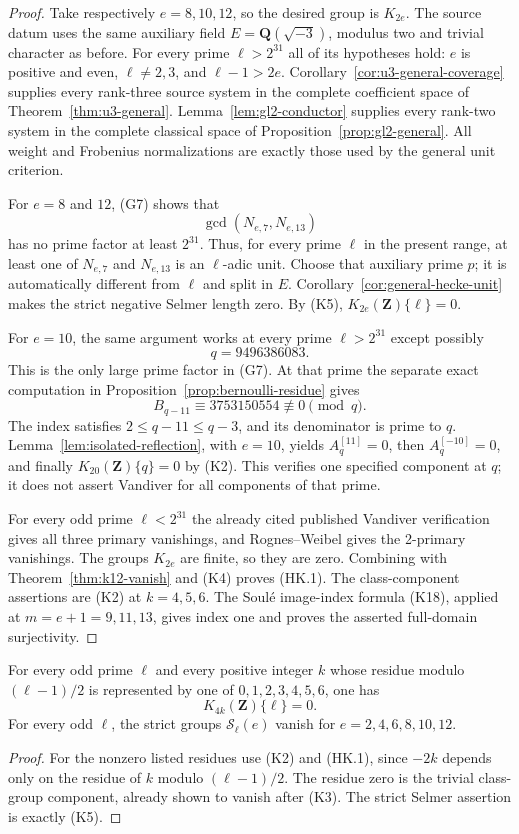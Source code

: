 \begin{proof}
Take respectively $e=8,10,12$, so the desired group is $K_{2e}$.
The source datum uses the same auxiliary field
$E=\mathbf Q(\sqrt{-3})$, modulus two and trivial character as before.
For every prime $\ell>2^{31}$ all of its hypotheses hold: $e$ is
positive and even, $\ell\ne2,3$, and $\ell-1>2e$.
Corollary~\ref{cor:u3-general-coverage} supplies every rank-three
source system in the complete coefficient space of
Theorem~\ref{thm:u3-general}. Lemma~\ref{lem:gl2-conductor} supplies
every rank-two system in the complete classical space of
Proposition~\ref{prop:gl2-general}. All weight and Frobenius
normalizations are exactly those used by the general unit criterion.

For $e=8$ and $12$, (G7) shows that
\[
               \gcd(N_{e,7},N_{e,13})
\]
has no prime factor at least $2^{31}$. Thus, for every prime $\ell$
in the present range, at least one of $N_{e,7}$ and $N_{e,13}$ is
an $\ell$-adic unit. Choose that auxiliary prime $p$; it is automatically
different from $\ell$ and split in $E$.
Corollary~\ref{cor:general-hecke-unit} makes the strict negative Selmer
length zero. By (K5), $K_{2e}(\mathbf Z)\{\ell\}=0$.

For $e=10$, the same argument works at every prime $\ell>2^{31}$
except possibly
\[
                         q=9496386083.
\]
This is the only large prime factor in (G7). At that prime the separate
exact computation in Proposition~\ref{prop:bernoulli-residue} gives
\[
 B_{q-11}\equiv3753150554\not\equiv0\pmod q.
\]
The index satisfies $2\le q-11\le q-3$, and its denominator is prime
to $q$. Lemma~\ref{lem:isolated-reflection}, with $e=10$, yields
$A_q^{[11]}=0$, then $A_q^{[-10]}=0$, and finally
$K_{20}(\mathbf Z)\{q\}=0$ by (K2).
This verifies one specified component at $q$; it does not assert
Vandiver for all components of that prime.

For every odd prime $\ell<2^{31}$ the already cited published
Vandiver verification gives all three primary vanishings, and
Rognes--Weibel gives the 2-primary vanishings. The groups $K_{2e}$
are finite, so they are zero. Combining with
Theorem~\ref{thm:k12-vanish} and (K4) proves (HK.1).
The class-component assertions are (K2) at $k=4,5,6$.
The Soul\'e image-index formula (K18), applied at $m=e+1=9,11,13$,
gives index one and proves the asserted full-domain surjectivity.
\end{proof}

\begin{corollary}
\label{cor:six-degrees-period}
For every odd prime $\ell$ and every positive integer $k$ whose residue
modulo $(\ell-1)/2$ is represented by one of
$0,1,2,3,4,5,6$, one has
\[
                         K_{4k}(\mathbf Z)\{\ell\}=0.
\]
For every odd $\ell$, the strict groups
$\mathcal S_\ell(e)$ vanish for $e=2,4,6,8,10,12$.
\end{corollary}
\begin{proof}
For the nonzero listed residues use (K2) and (HK.1), since $-2k$
depends only on the residue of $k$ modulo $(\ell-1)/2$.
The residue zero is the trivial class-group component, already shown
to vanish after (K3). The strict Selmer assertion is exactly (K5).
\end{proof}

